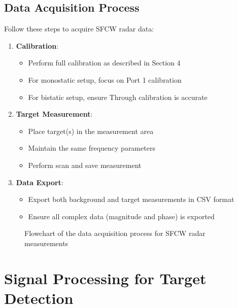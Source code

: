 \documentclass[12pt,a4paper]{article}
\begin{document}
\subsection{Data Acquisition Process}

Follow these steps to acquire SFCW radar data:

\begin{enumerate}
    \item \textbf{Calibration}:
    \begin{itemize}
        \item Perform full calibration as described in Section 4
        \item For monostatic setup, focus on Port 1 calibration
        \item For bistatic setup, ensure Through calibration is accurate
    \end{itemize}
    
    \item \textbf{Target Measurement}:
    \begin{itemize}
        \item Place target(s) in the measurement area
        \item Maintain the same frequency parameters
        \item Perform scan and save measurement
    \end{itemize}
    
    \item \textbf{Data Export}:
    \begin{itemize}
        \item Export both background and target measurements in CSV format
        \item Ensure all complex data (magnitude and phase) is exported
    \end{itemize}
\end{enumerate}

\begin{figure}[H]
    \centering
    \caption{Flowchart of the data acquisition process for SFCW radar measurements}
    \label{fig:acquisition}
\end{figure}

\section{Signal Processing for Target Detection}
\end{document}
